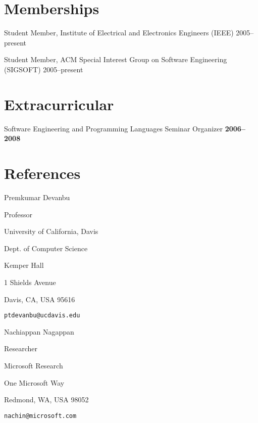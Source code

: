 \documentclass[margin,line,article]{res}
\newenvironment{noindentlist}{
  \begin{list}{}{%
      \setlength{\itemsep}{0in}
      \setlength{\parsep}{0in} \setlength{\parskip}{0in}
      \setlength{\topsep}{0in} \setlength{\partopsep}{0in} 
      \setlength{\leftmargin}{0in}}}{\end{list}}
\newenvironment{list1}{
  \begin{list}{}{%
      \setlength{\itemsep}{0in}
      \setlength{\parsep}{0in} \setlength{\parskip}{0in}
      \setlength{\topsep}{0in} \setlength{\partopsep}{0in} 
      \setlength{\leftmargin}{0.17in}}}{\end{list}}
\newenvironment{list2}{
  \begin{list}{$\bullet$}{%
      \setlength{\itemsep}{0in}
      \setlength{\parsep}{0in} \setlength{\parskip}{0in}
      \setlength{\topsep}{0in} \setlength{\partopsep}{0in} 
      \setlength{\leftmargin}{0.2in}}}{\end{list}}
\begin{document}
\begin{resume}
\section{Memberships}
\begin{noindentlist}
\item Student Member, Institute of Electrical and Electronics Engineers (IEEE) \hfill 2005--present
\item Student Member, ACM Special Interest Group on Software Engineering (SIGSOFT) \hfill 2005--present
\end{noindentlist}



\begin{comment}
I don't think anyone cares about this
\section{Technical Skills} 
\begin{list2}
\item Proficient:  C, Java, Python, C++, PostgreSQL, MySQL, Ruby, R, \LaTeX
\item Familiar: Lisp, Prolog, C\#, SML
\end{list2}
\end{comment}

\section{Extracurricular}
Software Engineering and Programming Languages Seminar Organizer \hfill \textbf{2006--2008}

\section{References}

Premkumar Devanbu
\begin{list1}
\item Professor
\item University of California, Davis
\item Dept. of Computer Science
\item Kemper Hall
\item 1 Shields Avenue
\item Davis, CA, USA 95616
\item \texttt{ptdevanbu@ucdavis.edu}
\end{list1}

Nachiappan Nagappan
\begin{list1}
\item Researcher
\item Microsoft Research
\item One Microsoft Way
\item Redmond, WA, USA 98052
\item \texttt{nachin@microsoft.com}
\end{list1}


\end{resume}
\end{document}
